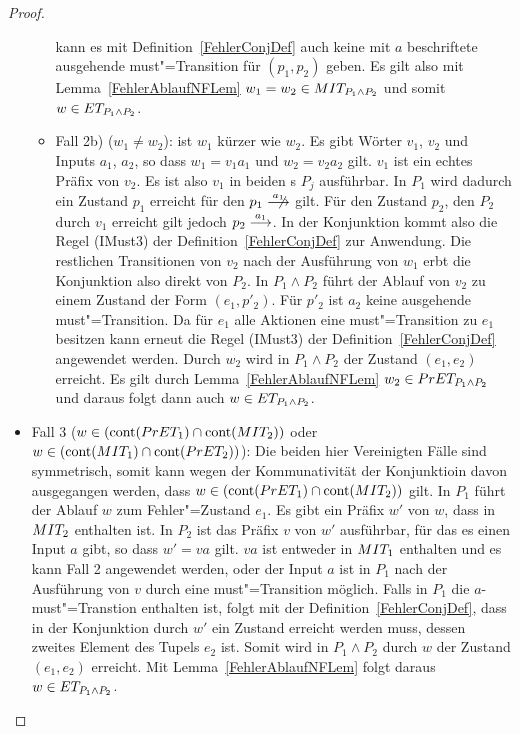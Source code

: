 \begin{proof}
\begin{itemize}
\begin{itemize}
          kann es mit Definition~\ref{FehlerConjDef} auch keine mit $a$ beschriftete
          ausgehende must"=Transition für $(p_1,p_2)$ geben. Es gilt also mit
          Lemma~\ref{FehlerAblaufNFLem} $w_1=w_2\in MIT _{P_1\land P_2}$ und somit
          $w\in ET _{P_1\land P_2}$.
        \item Fall 2b) ($w_1\neq w_2$): \OBdA{} ist $w_1$ kürzer wie $w_2$. Es
          gibt Wörter $v_1$, $v_2$ und Inputs $a_1$, $a_2$, so dass $w_1 =
          v_1a_1$ und $w_2 = v_2a_2$ gilt. $v_1$ ist ein echtes Präfix von
          $v_2$. Es ist also $v_1$ in beiden \MEIO{}s $P_j$ ausführbar. In
          $P_1$ wird dadurch ein Zustand $p_1$ erreicht für den
          $p_1\anmust[a_1]$ gilt. Für den Zustand $p_2$, den $P_2$ durch $v_1$
          erreicht gilt jedoch $p_2\must[a_1]$. In der Konjunktion kommt also
          die Regel (IMust3) der Definition~\ref{FehlerConjDef} zur Anwendung. Die
          restlichen Transitionen von $v_2$ nach der Ausführung von $w_1$ erbt
          die Konjunktion also direkt von $P_2$. In $P_1\land P_2$ führt der
          Ablauf von $v_2$ zu einem Zustand der Form $(e_1,p'_2)$. Für $p'_2$
          ist $a_2$ keine ausgehende must"=Transition. Da für $e_1$ alle
          Aktionen eine must"=Transition zu $e_1$ besitzen kann erneut die
          Regel (IMust3) der Definition~\ref{FehlerConjDef} angewendet werden. Durch
          $w_2$ wird in $P_1\land P_2$ der Zustand $(e_1,e_2)$ erreicht. Es
          gilt durch Lemma~\ref{FehlerAblaufNFLem} $w_2\in PrET _{P_1\land P_2}$ und
          daraus folgt dann auch $w\in ET _{P_1\land P_2}$.
      \end{itemize}
    \item Fall 3 ($w\in (\mathrm{cont} (PrET _1)\cap \mathrm{cont} (MIT _2))$ oder $w\in
      (\mathrm{cont} (MIT _1)\cap \mathrm{cont} (PrET _2))$): Die beiden hier Vereinigten
      Fälle sind symmetrisch, somit kann wegen der Kommunativität der
      Konjunktioin \oBdA{} davon ausgegangen werden, dass $w\in (\mathrm{cont} (PrET
      _1)\cap \mathrm{cont} (MIT _2))$ gilt. In $P_1$ führt der Ablauf $w$ zum
      Fehler"=Zustand $e_1$. Es gibt ein Präfix $w'$ von $w$, dass in $MIT _2$
      enthalten ist. In $P_2$ ist das Präfix $v$ von $w'$ ausführbar, für das
      es einen Input $a$ gibt, so dass $w'=va$ gilt. $va$ ist entweder in $MIT
      _1$ enthalten und es kann Fall 2 angewendet werden, oder der Input $a$
      ist in $P_1$ nach der Ausführung von $v$ durch eine must"=Transition
      möglich. Falls in $P_1$ die $a$-must"=Transtion enthalten ist, folgt mit
      der Definition~\ref{FehlerConjDef}, dass in der Konjunktion durch $w'$ ein
      Zustand erreicht werden muss, dessen zweites Element des Tupels $e_2$
      ist. Somit wird in $P_1\land P_2$ durch $w$ der Zustand $(e_1,e_2)$
      erreicht. Mit Lemma~\ref{FehlerAblaufNFLem} folgt daraus $w\in ET _{P_1\land
      P_2}$.
  \end{itemize}


\end{proof}
